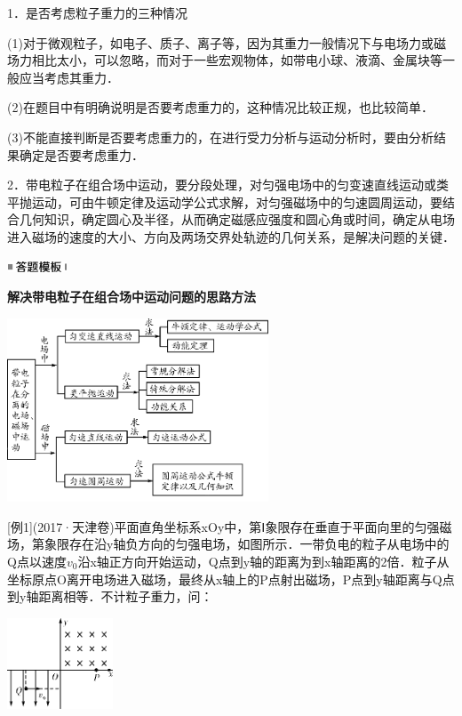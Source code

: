 1．是否考虑粒子重力的三种情况

(1)对于微观粒子，如电子、质子、离子等，因为其重力一般情况下与电场力或磁场力相比太小，可以忽略，而对于一些宏观物体，如带电小球、液滴、金属块等一般应当考虑其重力．

(2)在题目中有明确说明是否要考虑重力的，这种情况比较正规，也比较简单．

(3)不能直接判断是否要考虑重力的，在进行受力分析与运动分析时，要由分析结果确定是否要考虑重力．

2．带电粒子在组合场中运动，要分段处理，对匀强电场中的匀变速直线运动或类平抛运动，可由牛顿定律及运动学公式求解，对匀强磁场中的匀速圆周运动，要结合几何知识，确定圆心及半径，从而确定磁感应强度和圆心角或时间，确定从电场进入磁场的速度的大小、方向及两场交界处轨迹的几何关系，是解决问题的关键．

\begin{center}\includegraphics[width=0.70764in,height=0.12292in]{media/image25.png}\end{center}
\begin{center}
	\textbf{解决带电粒子在组合场中运动问题的思路方法}
\end{center}

\begin{center}\includegraphics[width=3.06597in,height=2.15069in]{media/image377.png}\end{center}

{[}例1{]}(2017·天津卷)平面直角坐标系xOy中，第Ⅰ象限存在垂直于平面向里的匀强磁场，第\uppercase\expandafter{}象限存在沿y轴负方向的匀强电场，如图所示．一带负电的粒子从电场中的Q点以速度$v_0$沿x轴正方向开始运动，Q点到y轴的距离为到x轴距离的2倍．粒子从坐标原点O离开电场进入磁场，最终从x轴上的P点射出磁场，P点到y轴距离与Q点到y轴距离相等．不计粒子重力，问：

\begin{center}\includegraphics[width=1.24514in,height=1.06597in]{media/image378.png}\end{center}

